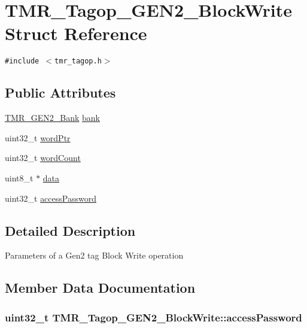 \hypertarget{struct_t_m_r___tagop___g_e_n2___block_write}{
\section{TMR\_\-Tagop\_\-GEN2\_\-BlockWrite Struct Reference}
\label{struct_t_m_r___tagop___g_e_n2___block_write}
}
{\tt \#include $<$tmr\_\-tagop.h$>$}

\subsection*{Public Attributes}
\begin{CompactItemize}
\item 
\hyperlink{tmr__gen2_8h_0037d967117e4d1fb33a75ef09a81b03}{TMR\_\-GEN2\_\-Bank} \hyperlink{struct_t_m_r___tagop___g_e_n2___block_write_cfa1f907071d9a3e935f28d722e35833}{bank}
\item 
uint32\_\-t \hyperlink{struct_t_m_r___tagop___g_e_n2___block_write_0d5e283619a33d2518fc2d49ae7ef835}{wordPtr}
\item 
uint32\_\-t \hyperlink{struct_t_m_r___tagop___g_e_n2___block_write_72f4be181aa38596747cce08565240ae}{wordCount}
\item 
uint8\_\-t $\ast$ \hyperlink{struct_t_m_r___tagop___g_e_n2___block_write_31099a65b191f94474363b0c25367f23}{data}
\item 
uint32\_\-t \hyperlink{struct_t_m_r___tagop___g_e_n2___block_write_79b49736a2b302aa0b87ca69ae0b952b}{accessPassword}
\end{CompactItemize}


\subsection{Detailed Description}
Parameters of a Gen2 tag Block Write operation 

\subsection{Member Data Documentation}
\hypertarget{struct_t_m_r___tagop___g_e_n2___block_write_79b49736a2b302aa0b87ca69ae0b952b}{
\subsubsection[{accessPassword}]{\setlength{\rightskip}{0pt plus 5cm}uint32\_\-t {\bf TMR\_\-Tagop\_\-GEN2\_\-BlockWrite::accessPassword}}}
\label{struct_t_m_r___tagop___g_e_n2___block_write_79b49736a2b302aa0b87ca69ae0b952b}


